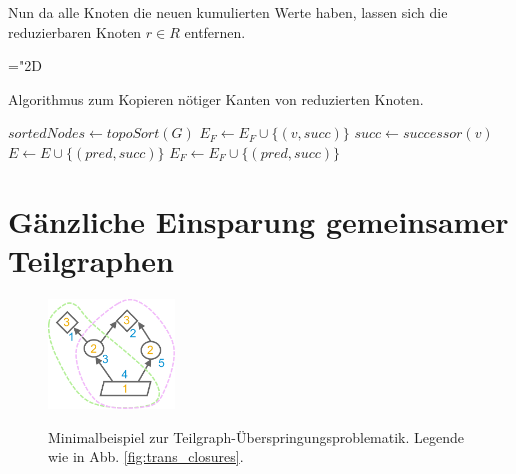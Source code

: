 Nun da alle Knoten die neuen kumulierten Werte haben, lassen sich die reduzierbaren Knoten $r \in R$ entfernen. 

\mathchardef\mhyphen="2D

\begin{algorithm}
	\caption{Algorithmus zum Kopieren nötiger Kanten von reduzierten Knoten.}\label{lst:reduce}
	\begin{algorithmic}[1]
		 
			\State $sortedNodes \gets topoSort(G)$
							\State $E_F \gets E_F \cup \{(v, succ)\}$ 
						\EndIf
					\EndFor
				\Else {}
					\State $succ \gets successor(v)$ 
							\State $E \gets E \cup \{(pred, succ)\}$
							\State $E_F \gets E_F \cup \{(pred, succ)\}$ 
						\EndIf
					\EndFor
				\EndIf
			\EndFor\label{euclidendwhile}
		\EndProcedure
	\end{algorithmic}
\end{algorithm}

\pagebreak %

\section{Gänzliche Einsparung gemeinsamer Teilgraphen} \label{sec:skip_entirely}

\begin{figure}
	\centering
	\vspace{-30pt} %
	\includegraphics[width=0.30\textwidth]{Bilder/problem_illustration.pdf}
	\vspace{-10pt}
	\caption[Minimalbeispiel zur Teilgraph-Überspringungs-Problematik. Legende wie in \autoref{fig:trans_closures}.]{\unskip}
	Minimalbeispiel zur Teilgraph-Überspringungsproblematik. Legende wie in Abb. \ref{fig:trans_closures}.
	\label{fig:prob_illu}
\end{figure}

